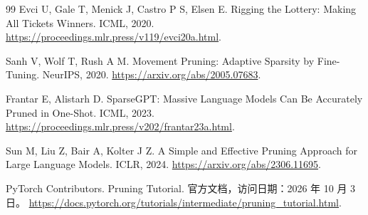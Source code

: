 \documentclass[UTF8,12pt,a4paper,fontset=fandol]{ctexart}
\begin{document}
\begin{thebibliography}{99}
Evci U, Gale T, Menick J, Castro P S, Elsen E. Rigging the Lottery: Making All Tickets Winners. ICML, 2020.
\url{https://proceedings.mlr.press/v119/evci20a.html}.

Sanh V, Wolf T, Rush A M. Movement Pruning: Adaptive Sparsity by Fine-Tuning. NeurIPS, 2020.
\url{https://arxiv.org/abs/2005.07683}.

Frantar E, Alistarh D. SparseGPT: Massive Language Models Can Be Accurately Pruned in One-Shot. ICML, 2023.
\url{https://proceedings.mlr.press/v202/frantar23a.html}.

Sun M, Liu Z, Bair A, Kolter J Z. A Simple and Effective Pruning Approach for Large Language Models. ICLR, 2024.
\url{https://arxiv.org/abs/2306.11695}.

PyTorch Contributors. Pruning Tutorial. 官方文档，访问日期：2026 年 10 月 3 日。
\url{https://docs.pytorch.org/tutorials/intermediate/pruning_tutorial.html}.
\end{thebibliography}
\end{document}
